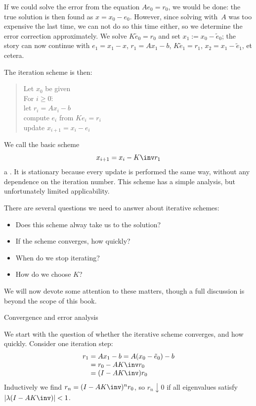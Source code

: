 If we could solve the error from the equation $Ae_0=r_0$, we would be
done: the true solution is then found as $x=x_0-e_0$. However,
since solving with~$A$ was
too expensive the last time, we can not do so this time either, so we
determine the error correction approximately.
We solve $K\tilde e_0=r_0$ and set $x_1:=x_0-\tilde e_0$; the story can now
continue with $e_1=x_1-x$, $r_1=Ax_1-b$, $K\tilde e_1=r_1$,
$x_2=x_1-\tilde e_1$, et cetera.

The iteration scheme is then:
  \begin{quote}
\begin{tabbing}
  Let $x_0$ be given\\
  For $i\geq0$\=:\\
  \>let $r_i=Ax_i-b$\\
  \>compute $e_i$ from $Ke_i=r_i$\\
  \>update $x_{i+1}=x_i-e_i$
\end{tabbing}
  \end{quote}
We call the basic scheme
\begin{equation}
  x_{i+1}=x_i-K\inv r_1
  \label{eq:stat-it}
\end{equation}
a . It is stationary
because every update is performed the same way, without any dependence
on the iteration number. This scheme has a simple analysis, but
unfortunately limited applicability.

There are several questions we need to answer about iterative schemes:
\begin{itemize}
\item Does this scheme alway take us to the solution?
\item If the scheme converges, how quickly?
\item When do we stop iterating?
\item How do we choose $K$?
\end{itemize}
We will now devote some attention to these matters, though a full
discussion is beyond the scope of this book.

 {Convergence and error analysis}
\label{sec:stationary-convergence}

We start with the question of whether the iterative scheme converges,
and how quickly. Consider one iteration step:
\begin{equation}
  \begin{array}{r@{{}={}}l}
    r_1&Ax_1-b=A(x_0-\tilde e_0)-b\\
    &r_0-AK\inv r_0\\
    &(I-AK\inv)r_0
  \end{array}
\end{equation}
Inductively we find $r_n=(I-AK\inv)^nr_0$, so $r_n\downarrow0$ if
  all eigenvalues satisfy $|\lambda(I-AK\inv)|<1$.

